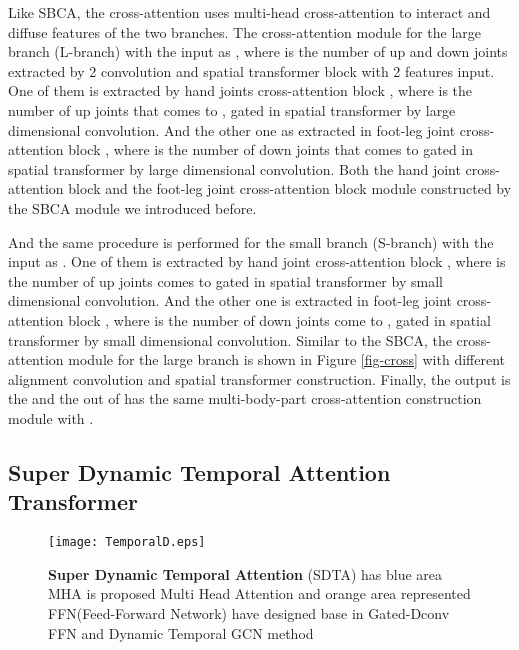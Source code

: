 \documentclass{bmvc2k}
\begin{document}
Like SBCA, the cross-attention uses multi-head cross-attention to interact and diffuse features of the two branches. The cross-attention module for the large branch (L-branch) with the input as , where  is the number of up and down joints extracted by 2  convolution and spatial transformer block with 2 features input. One of them is  extracted by hand joints cross-attention block , where  is the number of up joints that comes to ,  gated in spatial transformer by large dimensional convolution. And the other one as extracted in foot-leg joint cross-attention block , where  is the number of down joints that comes to  gated in spatial transformer by large dimensional convolution. Both the hand joint cross-attention block and the foot-leg joint cross-attention block module constructed by the SBCA module we introduced before.

And the same procedure is performed for the small branch (S-branch) with the input as .
One of them is extracted by hand joint cross-attention block , where  is the number of up joints comes to  gated in spatial transformer by small dimensional convolution. And the other one is extracted in foot-leg joint cross-attention block , where  is the number of down joints come to ,  gated in spatial transformer by small dimensional convolution. Similar to the SBCA, the cross-attention module for the large branch is shown in Figure \ref{fig-cross} with different alignment convolution and spatial transformer construction. Finally, the output is the  and the out of  has the same multi-body-part cross-attention construction module with .










\subsection{Super Dynamic Temporal Attention Transformer}
\begin{figure*}
\begin{center}
\texttt{[image: TemporalD.eps]}
\end{center}
   \caption{\textbf{Super Dynamic Temporal Attention} (SDTA) has blue area MHA is proposed Multi Head Attention and orange area represented FFN(Feed-Forward Network) have designed base in Gated-Dconv FFN\cite{Syed-2022} and Dynamic Temporal GCN method \cite{Haodong-2022}}
\label{fig-sdta}
\end{figure*}
\end{document}
